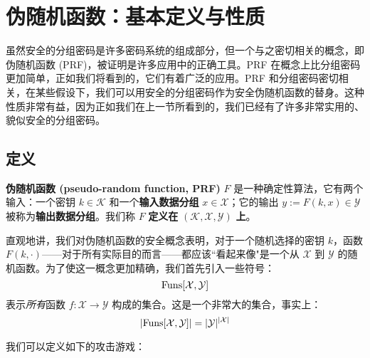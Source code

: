 \section{伪随机函数：基本定义与性质}\label{sec:4-4}

虽然安全的分组密码是许多密码系统的组成部分，但一个与之密切相关的概念，即伪随机函数 (PRF)，被证明是许多应用中的正确工具。PRF 在概念上比分组密码更加简单，正如我们将看到的，它们有着广泛的应用。PRF 和分组密码密切相关，在某些假设下，我们可以用安全的分组密码作为安全伪随机函数的替身。这种性质非常有益，因为正如我们在上一节所看到的，我们已经有了许多非常实用的、貌似安全的分组密码。

\subsection{定义}\label{subsec:4-4-1}

\textbf{伪随机函数 (pseudo-random function, PRF)} $F$ 是一种确定性算法，它有两个输入：一个密钥 $k\in\mathcal{K}$ 和一个\textbf{输入数据分组} $x\in\mathcal{X}$；它的输出 $y:=F(k,x)\in\mathcal{Y}$ 被称为\textbf{输出数据分组}。我们称 $F$ \textbf{定义在} $(\mathcal{K},\mathcal{X},\mathcal{Y})$ \textbf{上}。

直观地讲，我们对伪随机函数的安全概念表明，对于一个随机选择的密钥 $k$，函数 $F(k,\cdot)$——对于所有实际目的而言——都应该``看起来像"是一个从 $\mathcal{X}$ 到 $\mathcal{Y}$ 的随机函数。为了使这一概念更加精确，我们首先引入一些符号：
\[
{\rm Funs}[\mathcal{X},\mathcal{Y}]
\]
表示\emph{所有}函数 $f:\mathcal{X}\to\mathcal{Y}$ 构成的集合。这是一个非常大的集合，事实上：
\[
|{\rm Funs}[\mathcal{X},\mathcal{Y}]|=|\mathcal{Y}|^{|\mathcal{X}|}
\]

我们可以定义如下的攻击游戏：

